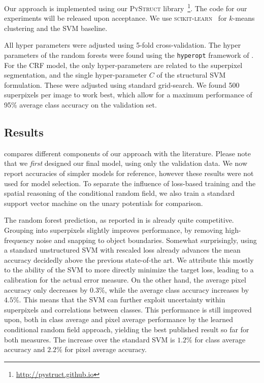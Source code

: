 \documentclass[a4paper, 10pt, conference]{ieeeconf}      %
\begin{document}
Our approach is implemented using our \textsc{PyStruct}
library~\footnote{\url{http://pystruct.github.io}}.  The code for our
experiments will be released upon acceptance. We use \textsc{scikit-learn}~\citep{pedregosa2011scikit}
for $k$-means clustering and the SVM baseline.

All hyper parameters were adjusted using 5-fold cross-validation. The
hyper parameters of the random forests were found using the \texttt{hyperopt}
framework of \cite{bergstra2011algorithms}. For the CRF model, the only
hyper-parameters are related to the superpixel segmentation, and the single
hyper-parameter $C$ of the structural SVM formulation. These were adjusted
using standard grid-search.
We found 500 superpixels per image to work best, which allow for a maximum
performance of 95\% average class accuracy on the validation set.

\subsection{Results}
 compares different components of our approach with the literature.
Please note that we \emph{first} designed our final model, using only the
validation data. We now report accuracies of simpler models for reference,
however these results were not used for model selection. To separate
the influence of loss-based training and the spatial reasoning of the conditional random field,
we also train a standard support vector machine on the unary potentials for comparison.

The random forest prediction, as reported in \citet{stueckler2013} is already quite competitive.
Grouping into superpixels slightly improves performance, by removing
high-frequency noise and snapping to object boundaries. Somewhat surprisingly,
using a standard unstructured SVM with rescaled loss already advances the mean
accuracy decidedly above the previous state-of-the art. We
attribute this mostly to the ability of the SVM to more directly minimize the
target loss, leading to a calibration for the actual error measure. On the
other hand, the average pixel accuracy only decreases by $0.3\%$, while the average class
accuracy increases by $4.5\%$. This means that the SVM can further exploit
uncertainty within superpixels and correlations between classes.
This performance is still improved upon, both in class average and pixel average performance
by the learned conditional random field approach, yielding the best published result
so far for both measures. The increase over the standard SVM is $1.2\%$ for class average accuracy
and $2.2\%$ for pixel average accuracy.
\end{document}
